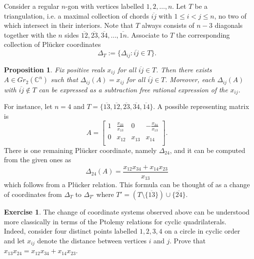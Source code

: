 \documentclass{amsart}
\newtheorem{proposition}[theorem]{Proposition}
\theoremstyle{definition}
\newtheorem{exercise}[theorem]{Exercise}
\theoremstyle{remark}
\numberwithin{equation}{section}
\newcommand{\CC}{{\mathbb{C}}}
\begin{document}
		Consider a regular $n$-gon with vertices labelled $1,2,\ldots, n$.  Let $T$ be a triangulation, i.e. a maximal collection of chords $\overline{ij}$ with $1 \leq i < j \leq n$, no two of which intersect in their interiors.  Note that $T$ always consists of $n-3$ diagonals together with the $n$ sides $\overline{12}, \overline{23}, \overline{34}, \ldots, \overline{1n}$.  Associate to $T$ the corresponding collection of Pl\"ucker coordinates
		\begin{displaymath}
			\Delta_T := \{\Delta_{ij} : \overline{ij} \in T\}.
		\end{displaymath}
    \setcounter{subproposition}{1}
		\begin{proposition} \label{prop:Gr2n}
		Fix positive reals $x_{ij}$ for all $\overline{ij} \in T$.  Then there exists $A \in Gr_2(\CC^n)$ such that $\Delta_{ij}(A) = x_{ij}$ for all $\overline{ij} \in T$.  Moreover, each $\Delta_{ij}(A)$ with $\overline{ij} \notin T$ can be expressed as a subtraction free rational expression of the $x_{ij}$.
		\end{proposition}
		
		For instance, let $n=4$ and $T = \{\overline{13},\overline{12},\overline{23},\overline{34},\overline{14}\}$.  A possible representing matrix is
		\begin{displaymath}
			A = \left[\begin{array}{cccc}
			1 & \frac{x_{23}}{x_{13}} & 0 & -\frac{x_{34}}{x_{13}} \\
			0 & x_{12} & x_{13} & x_{14} \\
			\end{array}\right].
		\end{displaymath}
		There is one remaining Pl\"ucker coordinate, namely $\Delta_{24}$, and it can be computed from the given ones as
		\begin{displaymath}
		\Delta_{24}(A) = \frac{x_{12}x_{34} + x_{14}x_{23}}{x_{13}}
		\end{displaymath}
		which follows from a Pl\"ucker relation.	This formula can be thought of as a change of coordinates from $\Delta_T$ to $\Delta_{T'}$ where $T' = (T \setminus \{\overline{13}\}) \cup \{\overline{24}\}$.  
    \setcounter{subexercise}{2}
    \begin{exercise}
      The change of coordinate systems observed above can be understood more classically in terms of the Ptolemy relations for cyclic quadrilaterals.  Indeed, consider four distinct points labelled $1,2,3,4$ on a circle in cyclic order and let $x_{ij}$ denote the distance between vertices $i$ and $j$.  Prove that $x_{13}x_{24}=x_{12}x_{34}+x_{14}x_{23}$.
    \end{exercise}
		
\end{document}
